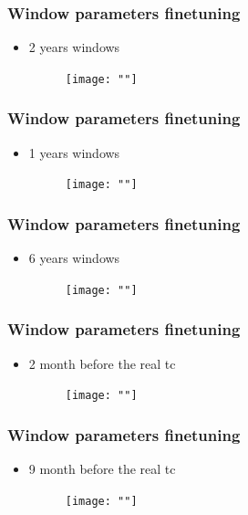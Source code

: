 \documentclass{beamer}
\begin{document}
\begin{frame}
    \frametitle{Window parameters finetuning}
    \begin{itemize}
        \item 2 years windows
        \begin{figure}[h]
        \texttt{[image: ""]}
        \end{figure}
    \end{itemize}
\end{frame}

\begin{frame}
    \frametitle{Window parameters finetuning}
    \begin{itemize}
        \item 1 years windows
        \begin{figure}[h]
        \texttt{[image: ""]}
        \end{figure}
    \end{itemize}
\end{frame}

\begin{frame}
    \frametitle{Window parameters finetuning}
    \begin{itemize}
        \item 6 years windows
        \begin{figure}[h]
        \texttt{[image: ""]}
        \end{figure}
    \end{itemize}
\end{frame}

\begin{frame}
    \frametitle{Window parameters finetuning}
    \begin{itemize}
        \item 2 month before the real tc
        \begin{figure}[h]
        \texttt{[image: ""]}
        \end{figure}
    \end{itemize}
\end{frame}

\begin{frame}
    \frametitle{Window parameters finetuning}
    \begin{itemize}
        \item 9 month before the real tc
        \begin{figure}[h]
        \texttt{[image: ""]}
        \end{figure}
    \end{itemize}
\end{frame}
\end{document}
